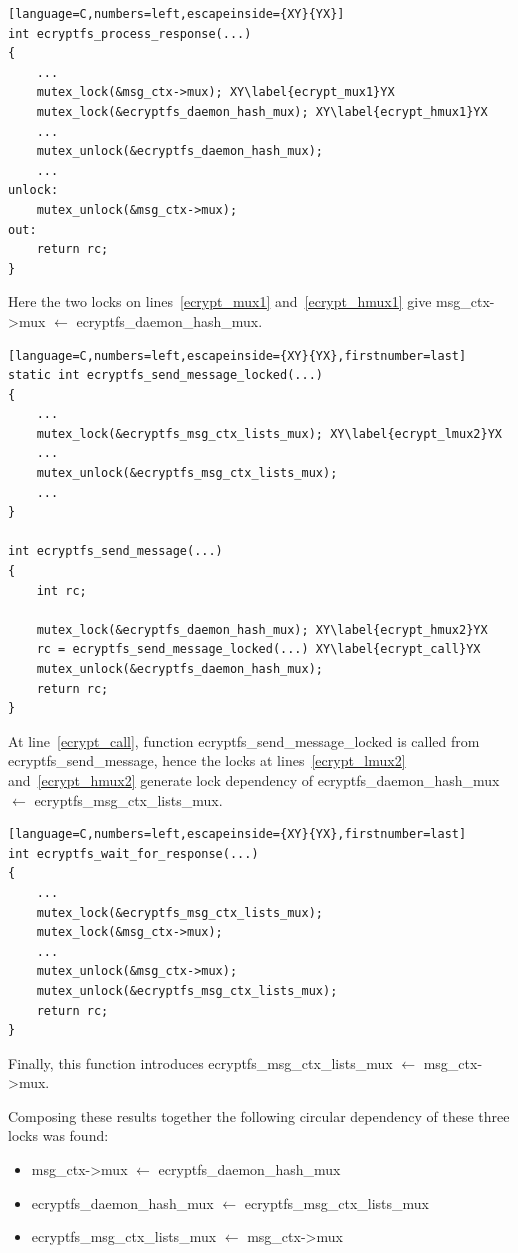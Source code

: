 \documentclass{llncs}
\begin{document}
\begin{lstlisting}[language=C,numbers=left,escapeinside={XY}{YX}]
int ecryptfs_process_response(...)
{
	...
	mutex_lock(&msg_ctx->mux); XY\label{ecrypt_mux1}YX
	mutex_lock(&ecryptfs_daemon_hash_mux); XY\label{ecrypt_hmux1}YX
	...
	mutex_unlock(&ecryptfs_daemon_hash_mux);
	...
unlock:
	mutex_unlock(&msg_ctx->mux);
out:
	return rc;
}
\end{lstlisting}
Here the two locks on lines~\ref{ecrypt_mux1} and~\ref{ecrypt_hmux1} give
\textsf{msg\_ctx-\textgreater mux} $\leftarrow$
\textsf{ecryptfs\_daemon\_hash\_mux}.
\begin{lstlisting}[language=C,numbers=left,escapeinside={XY}{YX},firstnumber=last]
static int ecryptfs_send_message_locked(...)
{
	...
	mutex_lock(&ecryptfs_msg_ctx_lists_mux); XY\label{ecrypt_lmux2}YX
	...
	mutex_unlock(&ecryptfs_msg_ctx_lists_mux);
	...
}

int ecryptfs_send_message(...)
{
	int rc;

	mutex_lock(&ecryptfs_daemon_hash_mux); XY\label{ecrypt_hmux2}YX
	rc = ecryptfs_send_message_locked(...) XY\label{ecrypt_call}YX
	mutex_unlock(&ecryptfs_daemon_hash_mux);
	return rc;
}
\end{lstlisting}
At line~\ref{ecrypt_call}, function \textsf{ecryptfs\_send\_message\_locked}
is called from \textsf{ecryptfs\_send\_message}, hence the locks at
lines~\ref{ecrypt_lmux2} and~\ref{ecrypt_hmux2} generate lock dependency of
\textsf{ecryptfs\_daemon\_hash\_mux} $\leftarrow$
\textsf{ecryptfs\_msg\_ctx\_lists\_mux}.
\begin{lstlisting}[language=C,numbers=left,escapeinside={XY}{YX},firstnumber=last]
int ecryptfs_wait_for_response(...)
{
	...
	mutex_lock(&ecryptfs_msg_ctx_lists_mux);
	mutex_lock(&msg_ctx->mux);
	...
	mutex_unlock(&msg_ctx->mux);
	mutex_unlock(&ecryptfs_msg_ctx_lists_mux);
	return rc;
}
\end{lstlisting}
Finally, this function introduces \textsf{ecryptfs\_msg\_ctx\_lists\_mux}
$\leftarrow$ \textsf{msg\_ctx-\textgreater mux}.

Composing these results together the following circular dependency of these
three locks was found:
\begin{itemize}
\item \textsf{msg\_ctx-\textgreater mux} $\leftarrow$ \textsf{ecryptfs\_daemon\_hash\_mux}
\item \textsf{ecryptfs\_daemon\_hash\_mux} $\leftarrow$ \textsf{ecryptfs\_msg\_ctx\_lists\_mux}
\item \textsf{ecryptfs\_msg\_ctx\_lists\_mux} $\leftarrow$
  \textsf{msg\_ctx-\textgreater mux}
\end{itemize}
\end{document}
